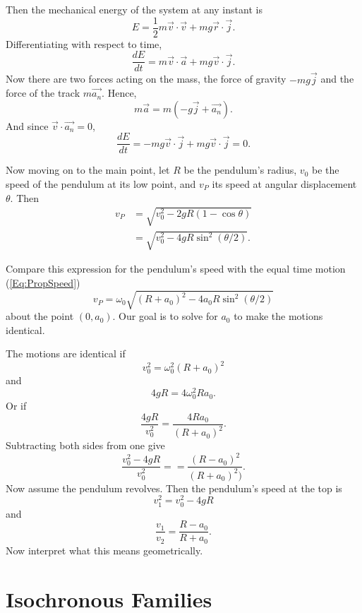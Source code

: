 \documentclass{ximera}
\begin{document}
Then the mechanical energy of the system at any instant is
\[
        E = \frac{1}{2}m \overrightarrow{v} \cdot \overrightarrow{v} + mg \overrightarrow{r}\cdot \overrightarrow{j} .
\] 
Differentiating with respect to time,
\[
     \frac{dE}{dt} = m\overrightarrow{v} \cdot \overrightarrow{a}  + m g \overrightarrow{v} \cdot \overrightarrow{j} .
\]
Now there are two forces acting on the mass, the force of gravity $-mg\overrightarrow{j}$  and the force of the track $m \overrightarrow{a_n}$. Hence, 
\[
   m\overrightarrow{a} = m \left(    -g\overrightarrow{j} + \overrightarrow{a_n}   \right) . 
\]
And since $\overrightarrow{v}\cdot \overrightarrow{a_n}=0$,
\[
    \frac{dE}{dt} = -mg \overrightarrow{v}\cdot \overrightarrow{j} + mg \overrightarrow{v} \cdot \overrightarrow{j} = 0.
\]


Now moving on to the main point, let $R$ be the pendulum's radius, $v_0$ be the speed of the pendulum at its low point, and $v_P$ its speed at angular displacement $\theta$. Then
\begin{align*}
    v_P    &= \sqrt{v_0^2 - 2gR(1-\cos\theta)}  \\
          &= \sqrt{v_0^2 - 4gR\sin^2 (\theta/2)} .
\end{align*}

Compare this expression for the pendulum's speed with the equal time motion (\ref{Eq:PropSpeed}) 
\[
    v_P  = \omega_0 \sqrt{(R+a_0)^2 - 4a_0R\sin^2(\theta/2)}
\]
about the point $(0,a_0)$. Our goal is to solve for $a_0$ to make the motions identical.

The motions are identical if
\[
     v_0^2 = \omega_0^2 (R+a_0)^2  
\]
and
\[
      4gR = 4\omega_0^2 Ra_0 .
\]
Or if
\[
    \frac{4gR}{v_0^2}    = \frac{4Ra_0}{(R+a_0)^2}      .
\]
Subtracting both sides from one give
\[
         \frac{v_0^2 - 4gR}{v_0^2} =  = \frac{(R - a_0)^2}{(R+a_0)^2)}  .
\]
Now assume the pendulum revolves. Then the pendulum's speed at the top is
\[
      v_1^2 = v_0^2 - 4gR 
\]
and
\[
    \frac{v_1}{v_2} = \frac{R-a_0}{R+a_0} .
\]
Now interpret what this means geometrically.



\section*{Isochronous Families}
\end{document}
